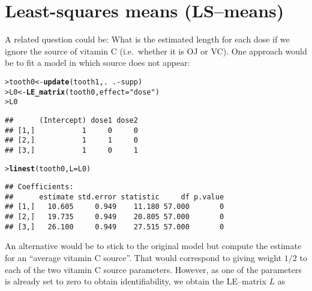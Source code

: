 \documentclass[11pt]{article}\usepackage[]{graphicx}\usepackage[]{color}
\makeatletter
\newcommand{\hlstr}[1]{\textcolor[rgb]{0.192,0.494,0.8}{#1}}%
\newcommand{\hlopt}[1]{\textcolor[rgb]{0,0,0}{#1}}%
\newcommand{\hlstd}[1]{\textcolor[rgb]{0.345,0.345,0.345}{#1}}%
\newcommand{\hlkwb}[1]{\textcolor[rgb]{0.69,0.353,0.396}{#1}}%
\newcommand{\hlkwc}[1]{\textcolor[rgb]{0.333,0.667,0.333}{#1}}%
\newcommand{\hlkwd}[1]{\textcolor[rgb]{0.737,0.353,0.396}{\textbf{#1}}}%
\newenvironment{kframe}{%
 \def\at@end@of@kframe{}%
 \ifinner\ifhmode%
  \def\at@end@of@kframe{\end{minipage}}%
  \begin{minipage}{\columnwidth}%
 \fi\fi%
 \def\FrameCommand##1{\hskip\@totalleftmargin \hskip-\fboxsep
 \colorbox{shadecolor}{##1}\hskip-\fboxsep
     \hskip-\linewidth \hskip-\@totalleftmargin \hskip\columnwidth}%
 \MakeFramed {\advance\hsize-\width
   \@totalleftmargin\z@ \linewidth\hsize
   \@setminipage}}%
 {\par\unskip\endMakeFramed%
 \at@end@of@kframe}
\newenvironment{knitrout}{}{} %
\renewenvironment{knitrout}{
  \begin{oldknitrout}
    \footnotesize
    \topsep=0pt
}{
  \end{oldknitrout}
}
\makeatother
\begin{document}
\section{Least-squares means (LS--means)}
\label{sec:least-squares-means}


A related question could be: What is the estimated length for each
dose if we ignore the source of vitamin C (i.e.\ whether it is OJ or
VC). One approach would be to fit a model in which source does not appear:

\begin{knitrout}
\color{fgcolor}\begin{kframe}
\begin{alltt}
\hlstd{> }\hlstd{tooth0} \hlkwb{<-} \hlkwd{update}\hlstd{(tooth1, .} \hlopt{~} \hlstd{.} \hlopt{-} \hlstd{supp)}
\hlstd{> }\hlstd{L0} \hlkwb{<-} \hlkwd{LE_matrix}\hlstd{(tooth0,} \hlkwc{effect}\hlstd{=}\hlstr{"dose"}\hlstd{)}
\hlstd{> }\hlstd{L0}
\end{alltt}
\begin{verbatim}
##      (Intercept) dose1 dose2
## [1,]           1     0     0
## [2,]           1     1     0
## [3,]           1     0     1
\end{verbatim}
\begin{alltt}
\hlstd{> }\hlkwd{linest}\hlstd{(tooth0,} \hlkwc{L}\hlstd{=L0)}
\end{alltt}
\begin{verbatim}
## Coefficients:
##      estimate std.error statistic     df p.value
## [1,]   10.605     0.949    11.180 57.000       0
## [2,]   19.735     0.949    20.805 57.000       0
## [3,]   26.100     0.949    27.515 57.000       0
\end{verbatim}
\end{kframe}
\end{knitrout}

An alternative would be to stick to the original model but compute the
estimate for an ``average vitamin C source''. That would correspond to
giving weight $1/2$ to each of the two vitamin C source
parameters. However, as one of the parameters is already set to zero
to obtain identifiability, we obtain the LE--matrix $L$ as
\end{document}
